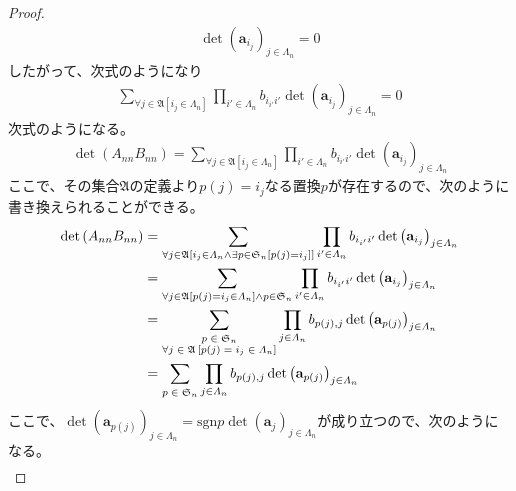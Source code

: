 \documentclass[dvipdfmx]{jsarticle}
\begin{document}
\begin{proof}
\begin{align*}
\det\left( \mathbf{a}_{i_{j}} \right)_{j \in \varLambda_{n}} = 0
\end{align*}
したがって、次式のようになり
\begin{align*}
\sum_{\forall j \in \mathfrak{A}\left[ i_{j} \in \varLambda_{n} \right]} {\prod_{i' \in \varLambda_{n}} b_{i_{i'}i'}\det\left( \mathbf{a}_{i_{j}} \right)_{j \in \varLambda_{n}}} = 0
\end{align*}
次式のようになる。
\begin{align*}
\det\left( A_{nn}B_{nn} \right) = \sum_{\forall j \in \mathfrak{A}\left[ i_{j} \in \varLambda_{n} \right]} {\prod_{i' \in \varLambda_{n}} b_{i_{i'}i'}\det\left( \mathbf{a}_{i_{j}} \right)_{j \in \varLambda_{n}}}
\end{align*}
ここで、その集合$\mathfrak{A}$の定義より$p(j) = i_{j}$なる置換$p$が存在するので、次のように書き換えられることができる。
\begin{align*}
\det\left( A_{nn}B_{nn} \right) &= \sum_{\forall j \in \mathfrak{A}\left[ i_{j} \in \varLambda_{n} \land \exists p \in \mathfrak{S}_{n}\left[ p(j) = i_{j} \right] \right]} {\prod_{i' \in \varLambda_{n}} b_{i_{i'}i'}\det\left( \mathbf{a}_{i_{j}} \right)_{j \in \varLambda_{n}}}\\
&= \sum_{\forall j \in \mathfrak{A}\left[ p(j) = i_{j} \in \varLambda_{n} \right] \land p \in \mathfrak{S}_{n}} {\prod_{i' \in \varLambda_{n}} b_{i_{i'}i'}\det\left( \mathbf{a}_{i_{j}} \right)_{j \in \varLambda_{n}}}\\
&= \sum_{\scriptsize \begin{matrix}
p \in \mathfrak{S}_{n} \\
\forall j \in \mathfrak{A}\left[ p(j) = i_{j} \in \varLambda_{n} \right] \\
\end{matrix}} {\prod_{j \in \varLambda_{n}} b_{p(j),j}\det\left( \mathbf{a}_{p(j)} \right)_{j \in \varLambda_{n}}}\\
&= \sum_{\scriptsize \begin{matrix}
p \in \mathfrak{S}_{n} \\
\end{matrix}} {\prod_{j \in \varLambda_{n}} b_{p(j),j}\det\left( \mathbf{a}_{p(j)} \right)_{j \in \varLambda_{n}}}
\end{align*}
ここで、$\det\left( \mathbf{a}_{p(j)} \right)_{j \in \varLambda_{n}} = {\mathrm{sgn} }p\det\left( \mathbf{a}_{j} \right)_{j \in \varLambda_{n}}$が成り立つので、次のようになる。
\begin{align*}

\end{align*}
\end{proof}
\end{document}
